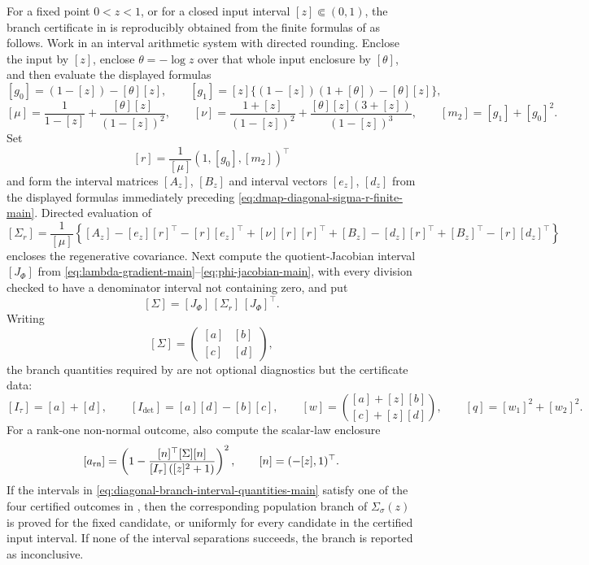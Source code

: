 \begin{algorithmiclemma}\label{lem:diagonal-interval-branch-certificate-main}
For a fixed point \(0<z<1\), or for a closed input interval
\([z]\Subset(0,1)\), the branch certificate in
 is reproducibly obtained from
the finite formulas of  as
follows.
Work in an interval arithmetic system with directed rounding.  Enclose the
input by \([z]\), enclose \(\theta=-\log z\) over that whole input enclosure by
\([\theta]\), and then evaluate the displayed formulas
\[
[g_0]=(1-[z])-[\theta][z],
\qquad
[g_1]=[z]\{(1-[z])(1+[\theta])-[\theta][z]\},
\]
\[
[\mu]=\frac1{1-[z]}+\frac{[\theta][z]}{(1-[z])^2},
\qquad
[\nu]=\frac{1+[z]}{(1-[z])^2}
     +\frac{[\theta][z](3+[z])}{(1-[z])^3},
\qquad
[m_2]=[g_1]+[g_0]^2.
\]
Set
\[
[r]=\frac1{[\mu]}(1,[g_0],[m_2])^\top
\]
and form the interval matrices \([A_z]\), \([B_z]\) and interval vectors
\([e_z]\), \([d_z]\) from the displayed formulas immediately preceding
\eqref{eq:dmap-diagonal-sigma-r-finite-main}.  Directed evaluation of
\[
[\Sigma_r]=\frac1{[\mu]}\left\{
[A_z]-[e_z][r]^\top-[r][e_z]^\top+[\nu][r][r]^\top
+[B_z]-[d_z][r]^\top+[B_z]^\top-[r][d_z]^\top
\right\}
\]
encloses the regenerative covariance.
Next compute the quotient-Jacobian interval \([J_\Phi]\) from
\eqref{eq:lambda-gradient-main}--\eqref{eq:phi-jacobian-main}, with every
division checked to have a denominator interval not containing zero, and put
\[
[\Sigma]=[J_\Phi]\,[\Sigma_r]\,[J_\Phi]^\top .
\]
Writing
\[
[\Sigma]=\begin{pmatrix}
[a]&[b]\\
[c]&[d]
\end{pmatrix},
\]
the branch quantities required by 
are not optional diagnostics but the certificate data:
\begin{equation}\label{eq:diagonal-branch-interval-quantities-main}
[I_{\tau}]=[a]+[d],\qquad
[I_{\det}]=[a][d]-[b][c],\qquad
[w]=
\binom{[a]+[z][b]}{[c]+[z][d]},
\qquad
[q]=[w_1]^2+[w_2]^2 .
\end{equation}
For a rank-one non-normal outcome, also compute the scalar-law enclosure
\begin{equation}\label{eq:diagonal-rank-one-nonnormal-scale-certificate-main}
[a_{\rm rn}]
=\left(
1-\frac{[n]^\top[\Sigma][n]}{[I_{\tau}]\,([z]^2+1)}
\right)^2,
\qquad [n]=(-[z],1)^\top .
\end{equation}
If the intervals in \eqref{eq:diagonal-branch-interval-quantities-main}
satisfy one of the four certified outcomes in
, then the corresponding
population branch of \(\Sigma_\sigma(z)\) is proved for the fixed candidate,
or uniformly for every candidate in the certified input interval.  If none of
the interval separations succeeds, the branch is reported as inconclusive.
\end{algorithmiclemma}

